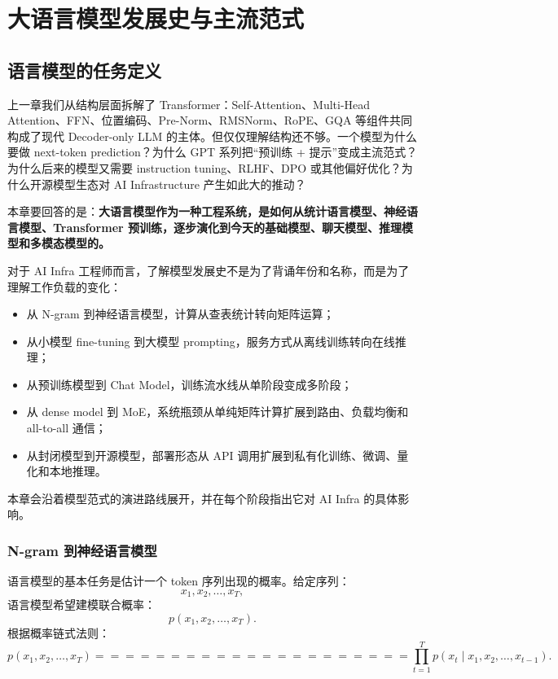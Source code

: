 \chapter{大语言模型发展史与主流范式}
\label{chap:llm-history}

\section{语言模型的任务定义}
\label{sec:language-modeling-task-definition}

上一章我们从结构层面拆解了 Transformer：Self-Attention、Multi-Head Attention、FFN、位置编码、Pre-Norm、RMSNorm、RoPE、GQA 等组件共同构成了现代 Decoder-only LLM 的主体。但仅仅理解结构还不够。一个模型为什么要做 next-token prediction？为什么 GPT 系列把“预训练 + 提示”变成主流范式？为什么后来的模型又需要 instruction tuning、RLHF、DPO 或其他偏好优化？为什么开源模型生态对 AI Infrastructure 产生如此大的推动？

本章要回答的是：\textbf{大语言模型作为一种工程系统，是如何从统计语言模型、神经语言模型、Transformer 预训练，逐步演化到今天的基础模型、聊天模型、推理模型和多模态模型的。}

对于 AI Infra 工程师而言，了解模型发展史不是为了背诵年份和名称，而是为了理解工作负载的变化：

\begin{itemize}
\item 从 N-gram 到神经语言模型，计算从查表统计转向矩阵运算；
\item 从小模型 fine-tuning 到大模型 prompting，服务方式从离线训练转向在线推理；
\item 从预训练模型到 Chat Model，训练流水线从单阶段变成多阶段；
\item 从 dense model 到 MoE，系统瓶颈从单纯矩阵计算扩展到路由、负载均衡和 all-to-all 通信；
\item 从封闭模型到开源模型，部署形态从 API 调用扩展到私有化训练、微调、量化和本地推理。
\end{itemize}

本章会沿着模型范式的演进路线展开，并在每个阶段指出它对 AI Infra 的具体影响。

\subsection{N-gram 到神经语言模型}
\label{subsec:ngram-to-neural-lm}

语言模型的基本任务是估计一个 token 序列出现的概率。给定序列：
\[
x_1,x_2,\ldots,x_T,
\]
语言模型希望建模联合概率：
\[
p(x_1,x_2,\ldots,x_T).
\]
根据概率链式法则：
\[
p(x_1,x_2,\ldots,x_T)
=====================

\prod_{t=1}^{T}
p(x_t\mid x_1,x_2,\ldots,x_{t-1}).
\]


